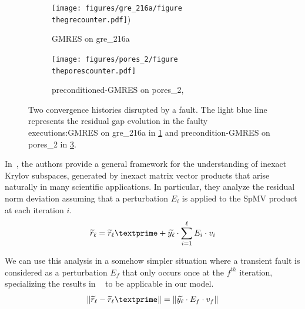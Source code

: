 \documentclass[twoside]{article}
\newcounter{fig}\setcounter{fig}{0}
\begin{document}
  \begin{figure}[H]
    \centering
    \begin{subfigure}[t]{0.45\linewidth}
      \centering
      \texttt{[image: figures/gre\_216a/figure\\thegrecounter.pdf]})
      \caption{GMRES on gre_216a}\label{fig:gre_216a_conv_hist_delta}		
    \end{subfigure}
    \quad
    \begin{subfigure}[t]{0.45\linewidth}
      \centering
      \texttt{[image: figures/pores\_2/figure\\theporescounter.pdf]}
      \caption{preconditioned-GMRES on pores_2, }\label{fig:pores_2_conv_hist_delta}
    \end{subfigure}
    \caption{Two convergence histories disrupted by a fault. The light blue line represents the residual gap evolution in the faulty executions:GMRES on gre_216a in \ref{fig:gre_216a_conv_hist_delta} and precondition-GMRES  on pores_2 in \ref{fig:pores_2_conv_hist_delta}.}
  \end{figure}




  In~\cite{sisz:03}, the authors provide a general framework for the understanding of inexact Krylov subspaces, generated by inexact matrix vector products that arise naturally in many scientific applications. In particular, they analyze the residual norm deviation assuming that a perturbation $E_i$ is applied to the SpMV product at each
  iteration $i$. 
  \begin{equation}\label{inexact_krylov}
    \widetilde{r}_\ell = \widetilde{r}_\ell\textprime + \widetilde{y_\ell} \cdot \sum_{i=1}^{\ell}{E_i \cdot v_i}
  \end{equation}

  We can use this analysis in a somehow simpler situation where a transient fault is considered as a perturbation $E_f$ that only occurs once at the $f^{th}$ iteration, specializing the results in ~\cite{sisz:03} to be applicable in our model.
  \begin{equation}\label{inexact_krylov_adapted}
    \| \widetilde{r}_\ell - \widetilde{r}_\ell\textprime \| =  \| \widetilde{y_\ell} \cdot E_f \cdot v_f \|
  \end{equation}
\end{document}
